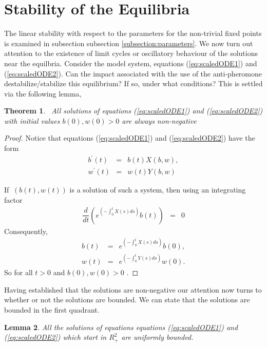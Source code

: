 \documentclass[12pt]{article}
\newtheorem{theorem}{Theorem}[section]
\newtheorem{lemma}[theorem]{Lemma}
\begin{document}
\section{Stability of the Equilibria}
\label{appendix:stability}

The linear stability with respect to the parameters for the
non-trivial fixed points is examined in subsection subsection
\ref{subsection:parameters}. We now turn out attention to the
existence of limit cycles or oscillatory behaviour of the solutions
near the equilbria. Consider the model system, equations
(\ref{eq:scaledODE1}) and (\ref{eq:scaledODE2}). Can the impact
associated with the use of the anti-pheromone destabilize/stabilize
this equilibrium? If so, under what conditions? This is settled via
the following lemma,
\begin{theorem}
  \bigskip\ All solutions of equations (\ref{eq:scaledODE1}) and
  (\ref{eq:scaledODE2}) with initial values
  $b\left( 0\right) ,w\left( 0\right) >0$ are always non-negative
\end{theorem}


\begin{proof}
  Notice that equations (\ref{eq:scaledODE1}) and
  (\ref{eq:scaledODE2}) have the form
\begin{eqnarray}
  b^{\prime}\left( t \right) & = & b(t)X\left( b,w\right), \\
  w^{\prime}\left( t \right) & = & w(t)Y\left( b,w\right)
\end{eqnarray}


If $\ \left( b\left( t\right) ,w\left( t\right) \right)
$ is a solution of such a system, then using an integrating factor
\begin{eqnarray}
\dfrac{d}{dt}\left( e^{\left( -\int_{0}^{t}X(s)ds\right) }b(t)\right) & = & 0
\end{eqnarray}
Consequently,
\begin{eqnarray}
b(t) & = & e^{\left( -\int_{0}^{t}X(s)ds\right) }b(0), \\
w(t) & = & e^{\left( -\int_{0}^{t}Y(s)ds\right) }w(0).
\end{eqnarray}
So for all $t>0$ and $b\left( 0\right) ,w\left( 0\right) >0$ .
\end{proof}

Having established that the solutions are non-negative our attention
now turns to whether or not the solutions are bounded. We can state
that the solutions are bounded in the first quadrant.

\begin{lemma} \label{mm} All the solutions of equations equations
  (\ref{eq:scaledODE1}) and (\ref{eq:scaledODE2}) which start in
  $R_{+}^{2}$ are uniformly bounded.
\end{lemma}
\end{document}
